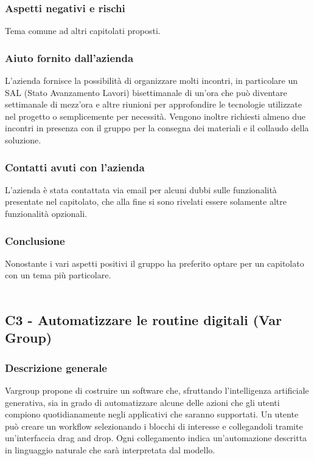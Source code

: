 \documentclass[10pt]{article}
\begin{document}
\subsubsection{Aspetti negativi e rischi}
Tema comune ad altri capitolati proposti.
\subsubsection{Aiuto fornito dall'azienda}
L’azienda fornisce la possibilità di organizzare molti incontri, in particolare un SAL (Stato Avanzamento Lavori) bisettimanale di un’ora che può diventare settimanale di mezz’ora e altre riunioni per approfondire le tecnologie utilizzate nel progetto o semplicemente per necessità. Vengono inoltre richiesti almeno due incontri in presenza con il gruppo per la consegna dei materiali e il collaudo della soluzione.

\subsubsection{Contatti avuti con l'azienda}
L’azienda è stata contattata via email per alcuni dubbi sulle funzionalità presentate nel capitolato, che alla fine si sono rivelati essere solamente altre funzionalità opzionali.

\subsubsection{Conclusione}
Nonostante i vari aspetti positivi il gruppo ha preferito optare per un capitolato con un tema più particolare.
\\\\
\subsection{C3 - Automatizzare le routine digitali (Var Group)}
\subsubsection{Descrizione generale}
Vargroup propone di costruire un software che, sfruttando l’intelligenza artificiale generativa, sia in grado di automatizzare alcune delle azioni che gli utenti compiono quotidianamente negli applicativi che saranno supportati. Un utente può creare un workflow selezionando i blocchi di interesse e collegandoli tramite un’interfaccia drag and drop. Ogni collegamento indica un'automazione descritta in linguaggio naturale che sarà interpretata dal modello.
\end{document}
